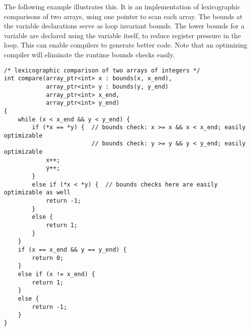 The following example illustrates this. It is an implementation of
lexicographic comparisons of two arrays, using one pointer to scan each
array. The bounds at the variable declarations serve as loop invariant
bounds. The lower bounds for a variable are declared using the variable
itself, to reduce register pressure in the loop. This can enable
compilers to generate better code. Note that an optimizing compiler will
eliminate the runtime bounds checks easily.

\begin{verbatim}
/* lexicographic comparison of two arrays of integers */
int compare(array_ptr<int> x : bounds(x, x_end), 
            array_ptr<int> y : bounds(y, y_end)
            array_ptr<int> x_end,
            array_ptr<int> y_end)
{ 
    while (x < x_end && y < y_end) {
        if (*x == *y) {  // bounds check: x >= x && x < x_end; easily optimizable
                         // bounds check: y >= y && y < y_end; easily optimizable
            x++;
            y++;
        }
        else if (*x < *y) {  // bounds checks here are easily optimizable as well
            return -1;
        }
        else {
            return 1;
        }
    }
    if (x == x_end && y == y_end) {
        return 0;
    }
    else if (x != x_end) {
        return 1;
    }
    else {
        return -1; 
    }
}
\end{verbatim}

